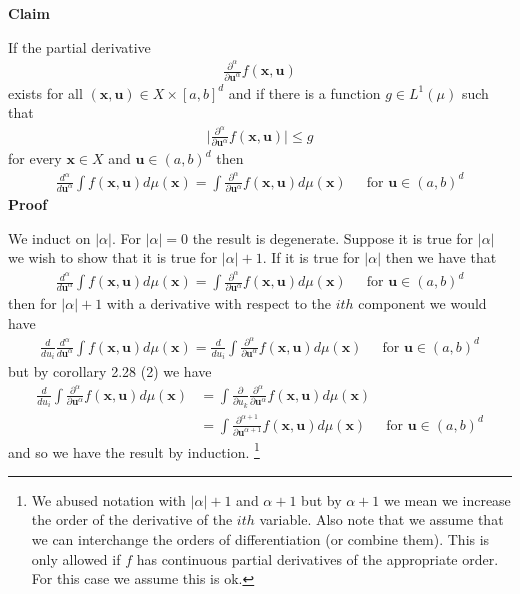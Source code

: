 \documentclass{unswmaths}
\begin{document}
\begin{mdframed}
\textbf{Claim}

If the partial derivative 
\begin{align}
	\frac{\partial^\alpha}{\partial\mathbf{u}^\alpha} f(\mathbf{x}, \mathbf{u})
\end{align}
exists for all $ (\mathbf{x}, \mathbf{u}) \in X \times [a, b]^d $ and if there is a function $ g \in L^{1}(\mu) $ such that
\begin{align}
	\Big| \frac{\partial^\alpha}{\partial \mathbf{u}^\alpha} f(\mathbf{x}, \mathbf{u}) \Big| \leq g
\end{align}
for every $ \mathbf{x} \in X $ and $ \mathbf{u} \in (a,b)^d $ then
\begin{align}
	\frac{d^\alpha}{d\mathbf{u}^\alpha} \int f(\mathbf{x}, \mathbf{u}) d\mu(\mathbf{x}) = \int \frac{\partial^\alpha}{\partial \mathbf{u}^\alpha} f(\mathbf{x}, \mathbf{u}) d\mu(\mathbf{x}) \ \ \ \ \ \text{ for } \mathbf{u} \in (a,b)^d
\end{align}
\textbf{Proof}

We induct on $ |\alpha| $. For $ |\alpha| = 0 $ the result is degenerate.
Suppose it is true for $ |\alpha| $ we wish to show that it is true for $ |\alpha| + 1 $. 
If it is true for $ |\alpha| $ then we have that
\begin{align}
	\frac{d^\alpha}{d\mathbf{u}^\alpha} \int f(\mathbf{x}, \mathbf{u}) d\mu(\mathbf{x}) = \int \frac{\partial^\alpha}{\partial \mathbf{u}^\alpha} f(\mathbf{x}, \mathbf{u}) d\mu(\mathbf{x}) \ \ \ \ \ \text{ for } \mathbf{u} \in (a,b)^d
\end{align}
then for $ |\alpha| + 1 $ with a derivative with respect to the $ ith $ component we would have
\begin{align}
	\frac{d}{du_i}\frac{d^\alpha}{d\mathbf{u}^\alpha} \int f(\mathbf{x}, \mathbf{u}) d\mu(\mathbf{x}) = \frac{d}{du_i}\int \frac{\partial^\alpha}{\partial \mathbf{u}^\alpha} f(\mathbf{x}, \mathbf{u}) d\mu(\mathbf{x}) \ \ \ \ \ \text{ for } \mathbf{u} \in (a,b)^d
\end{align}
but by corollary 2.28 (2) we have
\begin{align}
	\frac{d}{du_i}\int \frac{\partial^\alpha}{\partial \mathbf{u}^\alpha} f(\mathbf{x}, \mathbf{u}) d\mu(\mathbf{x})
 	&= \int \frac{\partial }{\partial u_k} \frac{\partial^\alpha}{\partial \mathbf{u}^\alpha} f(\mathbf{x}, \mathbf{u}) d\mu(\mathbf{x})\\
 	&= \int \frac{\partial^{\alpha+1}}{\partial \mathbf{u}^{\alpha+1}} f(\mathbf{x}, \mathbf{u}) d\mu(\mathbf{x}) \ \ \ \ \ \text{ for } \mathbf{u} \in (a,b)^d
\end{align}
and so we have the result by induction. \footnote{We abused notation with $ |\alpha| + 1 $ and $ \alpha + 1 $ but by $ \alpha + 1 $ we mean we increase the order of the derivative of the $ ith $ variable. Also note that we assume that we can interchange the orders of differentiation (or combine them). This is only allowed if $ f $ has continuous partial derivatives of the appropriate order. For this case we assume this is ok.} 
\end{mdframed}
\end{document}
